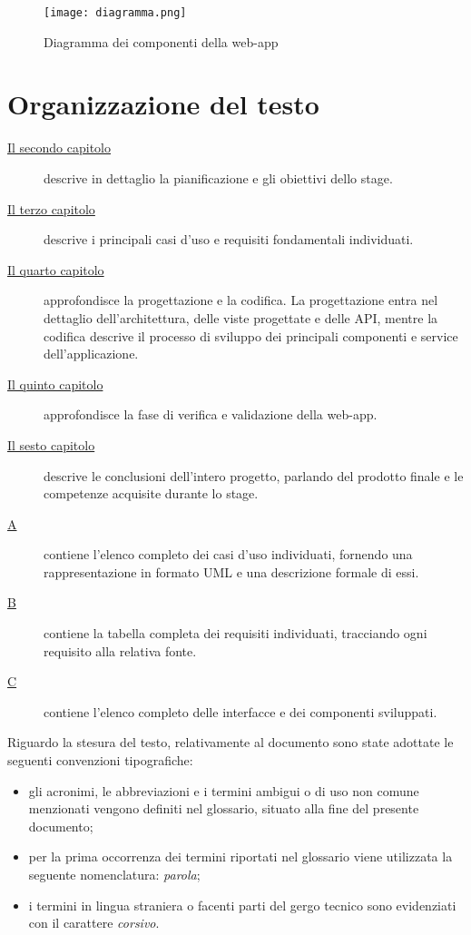 \begin{figure}[H]
    \centering
    \texttt{[image: diagramma.png]}
    \caption{Diagramma dei componenti della web-app}
\end{figure}


\section{Organizzazione del testo}

\begin{description}
    \item[{\hyperref[cap:il progetto di stage]{Il secondo capitolo}}] descrive in dettaglio la pianificazione e gli obiettivi dello stage.
    
    \item[{\hyperref[cap:analisi dei requisiti]{Il terzo capitolo}}] descrive i principali casi d'uso e requisiti fondamentali individuati.
    
    \item[{\hyperref[cap:progettazione e codifica]{Il quarto capitolo}}] approfondisce la progettazione e la codifica. La progettazione entra nel dettaglio dell'architettura, delle viste progettate e delle API, mentre la codifica descrive il processo di sviluppo dei principali componenti e service dell'applicazione.
    
    \item[{\hyperref[cap:verifica]{Il quinto capitolo}}] approfondisce la fase di verifica e validazione della web-app.
    
    \item[{\hyperref[cap:conclusioni]{Il sesto capitolo}}] descrive le conclusioni dell'intero progetto, parlando del prodotto finale e le competenze acquisite durante lo stage.
    \item[{\hyperref[cap:appendice a]{A}}] contiene l'elenco completo dei casi d'uso individuati, fornendo una rappresentazione in formato UML e una descrizione formale di essi.
    \item[{\hyperref[cap:appendice b]{B}}] contiene la tabella completa dei requisiti individuati, tracciando ogni requisito alla relativa fonte.
    \item[{\hyperref[cap:appendice c]{C}}] contiene l'elenco completo delle interfacce e dei componenti sviluppati.
\end{description}
Riguardo la stesura del testo, relativamente al documento sono state adottate le seguenti convenzioni tipografiche:
\begin{itemize}
	\item gli acronimi, le abbreviazioni e i termini ambigui o di uso non comune menzionati vengono definiti nel glossario, situato alla fine del presente documento;
	\item per la prima occorrenza dei termini riportati nel glossario viene utilizzata la seguente nomenclatura: \emph{parola}\glsfirstoccur;
	\item i termini in lingua straniera o facenti parti del gergo tecnico sono evidenziati con il carattere \emph{corsivo}.
\end{itemize}